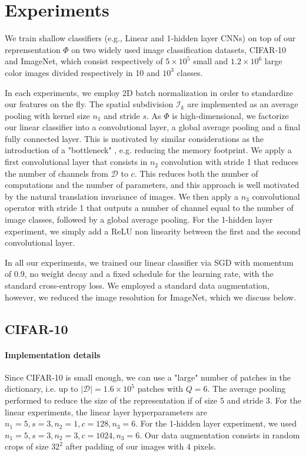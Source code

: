 \documentclass{article}
\begin{document}
{\section{Experiments}
\label{experiments}
We train  shallow classifiers (e.g., Linear and 1-hidden layer CNNs) on top of our reprensentation $\Phi$ on two widely used image classification datasets,  CIFAR-10 and ImageNet, which consist respectively of $5\times10^5$ small and $1.2\times10^6$ large color images  divided respectively in 10 and $10^3$ classes.


In each experiments, we employ 2D batch normalization in order to standardize our features on the fly. The spatial subdivision $\mathcal{I}_k$ are implemented as an average pooling with kernel size $n_1$ and stride $s$. 
As  $\Phi$ is high-dimensional, we factorize our linear classifier into a convolutional layer, a global average pooling and a final fully connected layer. This is motivated by similar considerations as the introduction of a "bottleneck" \cite{he2016deep}, e.g. reducing the memory footprint. We apply a first convolutional layer that consists in $n_2$ convolution with stride 1 that reduces the number of channels from $\mathcal{D}$ to $c$. This reduces both the number of computations and the number of parameters, and this approach is well motivated by the natural translation invariance of images.
We then apply a $n_3$ convolutional operator with stride 1 that outputs a number of channel equal to the number of image classes, followed by a global average pooling.
For the 1-hidden layer experiment, we simply add a ReLU non linearity between the first and the second convolutional layer.

In all our experiments, we trained our linear classifier via SGD with momentum of 0.9, no weight decay and a fixed schedule for the learning rate, with the standard cross-entropy loss. We employed a standard data augmentation, however, we reduced the image resolution for ImageNet, which we discuss below.



\subsection{CIFAR-10}

 \paragraph{Implementation details}Since CIFAR-10 is small enough, we can use a "large" number of patches in the dictionary, i.e. up to $|\mathcal{D}|=1.6\times10^5$ patches with $Q = 6$.
The average pooling performed to reduce the size of the representation if of size $5$ and stride $3$. For the linear experiments, the linear layer hyperparameters are  $n_1=5,s=3, n_2=1, c=128, n_3=6$.
For the 1-hidden layer experiment, we used $n_1=5, s=3, n_2=3,c=1024, n_3=6$.
Our data augmentation consists in random crops of size $32^2$ after  padding of our images with $4$ pixels.

}
\end{document}
